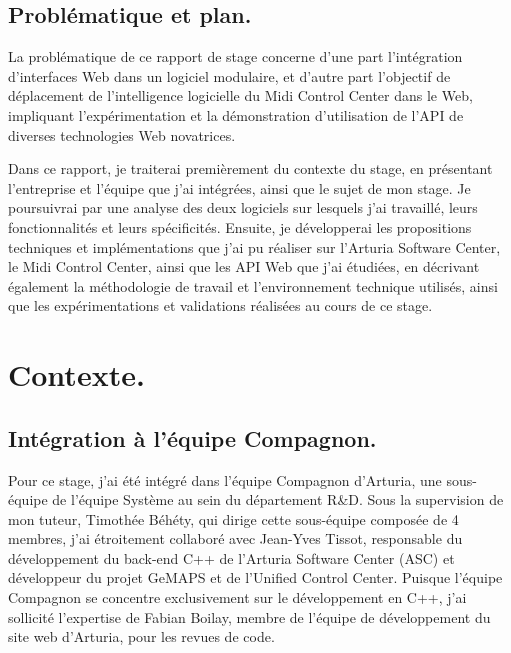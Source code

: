 \documentclass[francais]{rapportPFE}  %
\begin{document}
\subsection{Problématique et plan.}

La problématique de ce rapport de stage concerne d'une part l'intégration d'interfaces Web dans un logiciel modulaire, et d'autre part l'objectif de déplacement de l'intelligence logicielle du Midi Control Center dans le Web, impliquant l'expérimentation et la démonstration d'utilisation de l'API de diverses technologies Web novatrices.

Dans ce rapport, je traiterai premièrement du contexte du stage, en présentant l'entreprise et l'équipe que j'ai intégrées, ainsi que le sujet de mon stage. Je poursuivrai par une analyse des deux logiciels sur lesquels j'ai travaillé, leurs fonctionnalités et leurs spécificités. Ensuite, je développerai les propositions techniques et implémentations que j'ai pu réaliser sur l'Arturia Software Center, le Midi Control Center, ainsi que les API Web que j'ai étudiées, en décrivant également la méthodologie de travail et l'environnement technique utilisés, ainsi que les expérimentations et validations réalisées au cours de ce stage.


\section{Contexte.}

\subsection{Intégration à l'équipe Compagnon.}
Pour ce stage, j'ai été intégré dans l'équipe Compagnon d'Arturia, une sous-équipe de l'équipe Système au sein du département R\&D. Sous la supervision de mon tuteur, Timothée Béhéty, qui dirige cette sous-équipe composée de 4 membres, j'ai étroitement collaboré avec Jean-Yves Tissot, responsable du développement du back-end C++ de l'Arturia Software Center (ASC) et développeur du projet GeMAPS et de l'Unified Control Center. Puisque l'équipe Compagnon se concentre exclusivement sur le développement en C++, j'ai sollicité l'expertise de Fabian Boilay, membre de l'équipe de développement du site web d'Arturia, pour les revues de code. 
\end{document}
